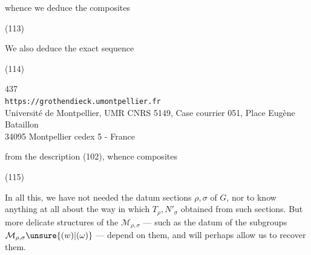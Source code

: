whence we deduce the composites

\noindent(113)

We also deduce the exact sequence

\noindent(114)


\begin{center}
{\small
437\\
\texttt{https://grothendieck.umontpellier.fr}\\
Université de Montpellier, UMR CNRS 5149, Case courrier 051, Place Eugène Bataillon\\
34095 Montpellier cedex 5 - France
}
\end{center}


from the description (102), whence composites

\noindent (115)

In all this, we have not needed the datum  sections $\rho,\sigma$
of $G$, nor to know anything at all about the way in which $T_\rho,N'_\sigma$
 obtained from such sections.
But more delicate  structures of the
$\mathcal{M}_{\rho,\sigma}$ --- such as the datum of the
 subgroups $\mathcal{M}_{\rho,\sigma}\unsure{(w)|(\omega)}$ ---
depend on them, and will perhaps allow us to recover them.

